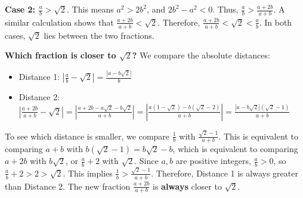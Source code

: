 \textbf{Case 2: $\frac{a}{b} > \sqrt{2}$}. This means $a^2 > 2b^2$, and $2b^2 - a^2 < 0$.
Thus, $\frac{a}{b} > \frac{a+2b}{a+b}$. A similar calculation shows that $\frac{a+2b}{a+b} < \sqrt{2}$.
Therefore, $\frac{a+2b}{a+b} < \sqrt{2} < \frac{a}{b}$. In both cases, $\sqrt{2}$ lies between the two fractions.

\textbf{Which fraction is closer to $\sqrt{2}$?}
We compare the absolute distances:
\begin{itemize}
\item Distance 1: $\left|\frac{a}{b} - \sqrt{2}\right| = \frac{|a - b\sqrt{2}|}{b}$
\item Distance 2: $\left|\frac{a + 2b}{a + b} - \sqrt{2}\right| = \left|\frac{a + 2b - a\sqrt{2} - b\sqrt{2}}{a + b}\right| = \left|\frac{a(1-\sqrt{2}) - b(\sqrt{2}-2)}{a + b}\right| = \frac{|a - b\sqrt{2}|(\sqrt{2}-1)}{a+b}$
\end{itemize}
To see which distance is smaller, we compare $\frac{1}{b}$ with $\frac{\sqrt{2}-1}{a+b}$.
This is equivalent to comparing $a+b$ with $b(\sqrt{2}-1) = b\sqrt{2} - b$, which is equivalent to comparing $a+2b$ with $b\sqrt{2}$, or $\frac{a}{b} + 2$ with $\sqrt{2}$.
Since $a, b$ are positive integers, $\frac{a}{b} > 0$, so $\frac{a}{b} + 2 > 2 > \sqrt{2}$.
This implies $\frac{1}{b} > \frac{\sqrt{2}-1}{a+b}$.
Therefore, Distance 1 is always greater than Distance 2. The new fraction $\frac{a+2b}{a+b}$ is \textbf{always} closer to $\sqrt{2}$.

